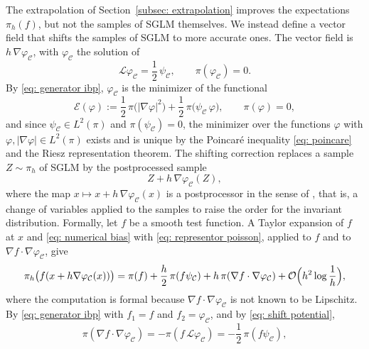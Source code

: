 \documentclass{article}
\numberwithin{equation}{section}
\begin{document}
The extrapolation of Section~\ref{subsec: extrapolation} improves the expectations $\pi_h(f)$, but not the samples of SGLM themselves. We instead define a vector field that shifts the samples of SGLM to more accurate ones. The vector field is $h\, \nabla \varphi_{\mathcal C}$, with $\varphi_{\mathcal C}$ the solution of
\begin{equation}
    \mathcal L \varphi_{\mathcal C} = \frac12\, \psi_{\mathcal C} , \qquad \pi(\varphi_{\mathcal C}) = 0 .
    \label{eq: shift potential}
\end{equation}
By \eqref{eq: generator ibp}, $\varphi_{\mathcal C}$ is the minimizer of the functional
\begin{equation}
    \mathcal E(\varphi) := \frac12\, \pi\bigl( |\nabla \varphi|^2 \bigr) + \frac12\, \pi\bigl( \psi_{\mathcal C}\, \varphi \bigr) , \qquad \pi(\varphi) = 0 ,
    \label{eq: shift energy}
\end{equation}
and since $\psi_{\mathcal C} \in L^2(\pi)$ and $\pi(\psi_{\mathcal C}) = 0$, the minimizer over the functions $\varphi$ with $\varphi, |\nabla \varphi| \in L^2(\pi)$ exists and is unique by the Poincar\'e inequality \eqref{eq: poincare} and the Riesz representation theorem. The shifting correction replaces a sample $Z \sim \pi_h$ of SGLM by the postprocessed sample
\begin{equation}
    Z + h\, \nabla \varphi_{\mathcal C}(Z) ,
    \label{eq: shifting correction}
\end{equation}
where the map $x \mapsto x + h\, \nabla \varphi_{\mathcal C}(x)$ is a postprocessor in the sense of \citep{vilmart2015postprocessed}, that is, a change of variables applied to the samples to raise the order for the invariant distribution. Formally, let $f$ be a smooth test function. A Taylor expansion of $f$ at $x$ and \eqref{eq: numerical bias} with \eqref{eq: representor poisson}, applied to $f$ and to $\nabla f \cdot \nabla \varphi_{\mathcal C}$, give
\begin{equation*}
    \pi_h\bigl( f(x + h \nabla \varphi_{\mathcal C}(x)) \bigr) = \pi(f) + \frac h2\, \pi(f \psi_{\mathcal C}) + h\, \pi(\nabla f \cdot \nabla \varphi_{\mathcal C}) + \mathcal O\Bigl( h^2 \log\frac1h \Bigr) ,
\end{equation*}
where the computation is formal because $\nabla f \cdot \nabla \varphi_{\mathcal C}$ is not known to be Lipschitz.
By \eqref{eq: generator ibp} with $f_1 = f$ and $f_2 = \varphi_{\mathcal C}$, and by \eqref{eq: shift potential},
\begin{equation*}
    \pi(\nabla f \cdot \nabla \varphi_{\mathcal C}) = -\pi(f\, \mathcal L \varphi_{\mathcal C}) = -\frac12\, \pi(f \psi_{\mathcal C}) ,
\end{equation*}
\end{document}
